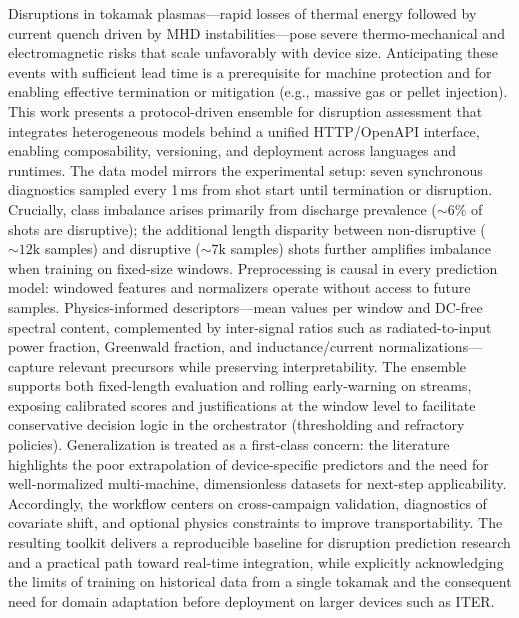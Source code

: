 Disruptions in tokamak plasmas—rapid losses of thermal energy followed by current quench driven by \ac{MHD} instabilities—pose severe thermo-mechanical and electromagnetic risks that scale unfavorably with device size. Anticipating these events with sufficient lead time is a prerequisite for machine protection and for enabling effective termination or mitigation (e.g., massive gas or pellet injection). 
This work presents a protocol-driven ensemble for disruption assessment that integrates heterogeneous models behind a unified \acs{HTTP}/OpenAPI interface, enabling composability, versioning, and deployment across languages and runtimes. 
The data model mirrors the experimental setup: seven synchronous diagnostics sampled every 1\,ms from shot start until termination or disruption. Crucially, class imbalance arises primarily from discharge prevalence (\(\sim\!6\%\) of shots are disruptive); the additional length disparity between non-disruptive (\(\sim\!12\mathrm{k}\) samples) and disruptive (\(\sim\!7\mathrm{k}\) samples) shots further amplifies imbalance when training on fixed-size windows. 
Preprocessing is causal in every prediction model: windowed features and normalizers operate without access to future samples.
Physics-informed descriptors—mean values per window and DC-free spectral content, complemented by inter-signal ratios such as radiated-to-input power fraction, Greenwald fraction, and inductance/current normalizations—capture relevant precursors while preserving interpretability. 
The ensemble supports both fixed-length evaluation and rolling early-warning on streams, exposing calibrated scores and justifications at the window level to facilitate conservative decision logic in the orchestrator (thresholding and refractory policies). 
Generalization is treated as a first-class concern: the literature highlights the poor extrapolation of device-specific predictors and the need for well-normalized multi-machine, dimensionless datasets for next-step applicability. 
Accordingly, the workflow centers on cross-campaign validation, diagnostics of covariate shift, and optional physics constraints to improve transportability. 
The resulting toolkit delivers a reproducible baseline for disruption prediction research and a practical path toward real-time integration, while explicitly acknowledging the limits of training on historical data from a single tokamak and the consequent need for domain adaptation before deployment on larger devices such as \ac{ITER}.

